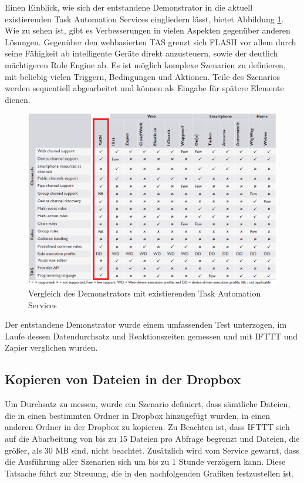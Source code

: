 Einen Einblick, wie sich der entstandene Demonstrator in die aktuell existierenden Task Automation Services eingliedern lässt, bietet Abbildung \ref{fig:eval0}. Wie zu sehen ist, gibt es Verbesserungen in vielen Aspekten gegenüber anderen Lösungen. Gegenüber den webbasierten TAS grenzt sich FLASH vor allem durch seine Fähigkeit ab intelligente Geräte direkt anzusteuern, sowie der deutlich mächtigeren Rule Engine ab. Es ist möglich komplexe Szenarien zu definieren, mit beliebig vielen Triggern, Bedingungen und Aktionen. Teile des Szenarios werden sequentiell abgearbeitet und können als Eingabe für spätere Elemente dienen.\\

\begin{figure}
	\centering
	\includegraphics[width=\textwidth]{bilder/TASOverview_eval}
	\caption{Vergleich des Demonstrators mit existierenden Task Automation Services}
	\label{fig:eval0}
\end{figure}


Der entstandene Demonstrator wurde einem umfassenden Test unterzogen, im Laufe dessen Datendurchsatz und Reaktionszeiten gemessen und mit IFTTT und Zapier verglichen wurden. 

\subsection{Kopieren von Dateien in der Dropbox}
Um Durchsatz zu messen, wurde ein Szenario definiert, dass sämtliche Dateien, die in einen bestimmten Ordner in Dropbox hinzugefügt wurden, in einen anderen Ordner in der Dropbox zu kopieren. Zu Beachten ist, dass IFTTT sich auf die Abarbeitung von bis zu 15 Dateien pro Abfrage begrenzt und Dateien, die größer, als 30 MB sind, nicht beachtet. Zusätzlich wird vom Service gewarnt, dass die Ausführung aller Szenarien sich um bis zu 1 Stunde verzögern kann. Diese Tatsache führt zur Streuung, die in den nachfolgenden Grafiken festzustellen ist.

